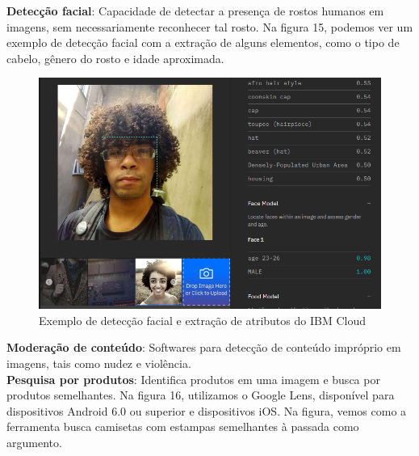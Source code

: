 \documentclass{article}
\begin{document}
\textbf{Detecção facial}: Capacidade de detectar a presença de rostos humanos em imagens, sem necessariamente reconhecer tal rosto. Na figura 15, podemos ver um exemplo de detecção facial com a extração de alguns elementos, como o tipo de cabelo, gênero do rosto e idade aproximada.\\
\begin{figure}[H]
    \centering
    \includegraphics[scale=0.29]{imagens/caracteristicas_watson_visual_recog.png}
    \caption{Exemplo de detecção facial e extração de atributos do IBM Cloud}
    \label{fig:detecção_facial}
\end{figure}{}
\textbf{Moderação de conteúdo}: Softwares para detecção de conteúdo impróprio em imagens, tais como nudez e violência. \\
\textbf{Pesquisa por produtos}: Identifica produtos em uma imagem e busca por produtos semelhantes. Na figura 16, utilizamos o Google Lens, disponível para dispositivos Android 6.0 ou superior e dispositivos iOS. Na figura, vemos como a ferramenta busca camisetas com estampas semelhantes à passada como argumento. \\
\end{document}
